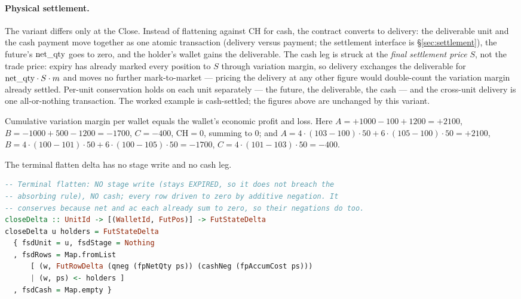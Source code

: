 \paragraph{Physical settlement.} The variant differs only at the Close. Instead of flattening against
CH for cash, the contract converts to delivery: the deliverable unit and the cash payment move
together as one atomic transaction (delivery versus payment; the settlement interface is
\S\ref{sec:settlement}), the future's $\mathrm{net\_qty}$ goes to zero, and the holder's wallet gains the deliverable.
The cash leg is struck at the \emph{final settlement price} $S$, not the trade price: expiry has
already marked every position to $S$ through variation margin, so delivery exchanges the deliverable
for $\mathrm{net\_qty}\cdot S\cdot m$ and moves no further mark-to-market --- pricing the delivery at any other
figure would double-count the variation margin already settled. Per-unit conservation holds on each
unit separately --- the future, the deliverable, the cash --- and the cross-unit delivery is one
all-or-nothing transaction. The worked example is cash-settled; the figures above are unchanged by
this variant.

\begin{theorem}
Cumulative variation margin per wallet equals the wallet's economic profit and loss. Here
$A=+1000-100+1200=+2100$, $B=-1000+500-1200=-1700$, $C=-400$, $\text{CH}=0$, summing to $0$; and
$A=4\cdot(103-100)\cdot 50+6\cdot(105-100)\cdot 50=+2100$,
$B=4\cdot(100-101)\cdot 50+6\cdot(100-105)\cdot 50=-1700$, $C=4\cdot(101-103)\cdot 50=-400$.
\end{theorem}

The terminal flatten delta has no stage write and no cash leg.

\begin{lstlisting}[language=Haskell]
-- Terminal flatten: NO stage write (stays EXPIRED, so it does not breach the
-- absorbing rule), NO cash; every row driven to zero by additive negation. It
-- conserves because net and ac each already sum to zero, so their negations do too.
closeDelta :: UnitId -> [(WalletId, FutPos)] -> FutStateDelta
closeDelta u holders = FutStateDelta
  { fsdUnit = u, fsdStage = Nothing
  , fsdRows = Map.fromList
      [ (w, FutRowDelta (qneg (fpNetQty ps)) (cashNeg (fpAccumCost ps)))
      | (w, ps) <- holders ]
  , fsdCash = Map.empty }
\end{lstlisting}

